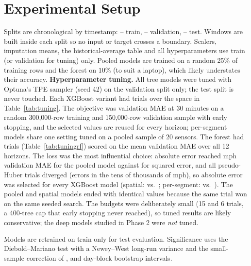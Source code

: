 \documentclass[conference]{IEEEtran}
\begin{document}
\section{Experimental Setup}\label{sec:setup}
Splits are chronological by timestamp: \splitTrainStart--\splitTrainEnd{} train, \splitValStart--\splitValEnd{} validation, \splitTestStart--\splitTestEnd{} test.
Windows are built inside each split so no input or target crosses a boundary.
Scalers, imputation means, the historical-average table and all hyperparameters use train (or validation for tuning) only.
Pooled models are trained on a random 25\% of training rows and the forest on 10\% (to suit a laptop), which likely understates their accuracy.
\textbf{Hyperparameter tuning.} All tree models were tuned with Optuna's TPE sampler (seed 42) on the validation split only; the test split is never touched.
Each XGBoost variant had \tuneTrialsGlobal{} trials over the space in Table~\ref{tab:tuning}.
The objective was validation MAE at 30 minutes on a random 300,000-row training and 150,000-row validation sample with early stopping, and the selected values are reused for every horizon; per-segment models share one setting tuned on a pooled sample of 20 sensors.
The forest had \tuneTrialsRf{} trials (Table~\ref{tab:tuningrf}) scored on the mean validation MAE over all 12 horizons.
The loss was the most influential choice: absolute error reached \tuneAbsGlobal{} mph validation MAE for the pooled model against \tuneSqGlobal{} for squared error, and all \tuneHubTrialsGlobal{} pseudo-Huber trials diverged (errors in the tens of thousands of mph), so absolute error was selected for every XGBoost model (spatial: \tuneAbsSpatial{} vs.\ \tuneSqSpatial{}; per-segment: \tuneAbsSegment{} vs.\ \tuneSqSegment{}).
The pooled and spatial models ended with identical values because the same trial won on the same seeded search.
The budgets were deliberately small (15 and 6 trials, a 400-tree cap that early stopping never reached), so tuned results are likely conservative; the deep models studied in Phase 2 were \emph{not} tuned.


Models are retrained on train only for test evaluation.
Significance uses the Diebold--Mariano test \cite{diebold1995comparing} with a Newey--West long-run variance \cite{newey1987simple} and the small-sample correction of \cite{harvey1997testing}, and day-block bootstrap intervals.
\end{document}
